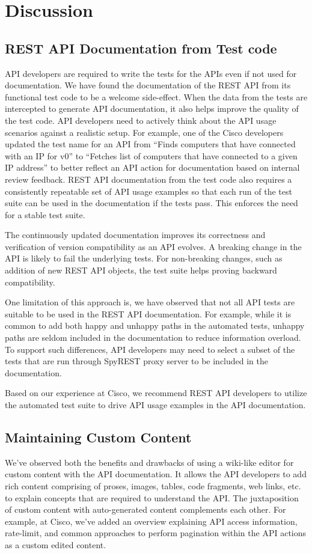 \documentclass[10pt, conference]{IEEEtran}
\begin{document}
\section{Discussion}

\subsection{REST API Documentation from Test code}
API developers are required to write the tests for the APIs even if not used for documentation. We have found the documentation of the REST API from its functional test code to be a welcome side-effect. When the data from the tests are intercepted to generate API documentation, it also helps improve the quality of the test code. API developers need to actively think about the API usage scenarios against a realistic setup. For example, one of the Cisco developers updated the test name for an API from ``Finds computers that have connected with an IP for v0'' to ``Fetches list of computers that have connected to a given IP address'' to better reflect an API action for documentation based on internal review feedback. REST API documentation from the test code also requires a consistently repeatable set of API usage examples so that each run of the test suite can be used in the documentation if the tests pass. This enforces the need for a stable test suite.

The continuously updated documentation improves its correctness and verification of version compatibility as an API evolves. A breaking change in the API is likely to fail the underlying tests. For non-breaking changes, such as addition of new REST API objects, the test suite helps proving backward compatibility.

One limitation of this approach is, we have observed that not all API tests are suitable to be used in the REST API documentation. For example, while it is common to add both happy and unhappy paths in the automated tests, unhappy paths are seldom included in the documentation to reduce information overload. To support such differences, API developers may need to select a subset of the tests that are run through SpyREST proxy server to be included in the documentation.

Based on our experience at Cisco, we recommend REST API developers to utilize the automated test suite to drive API usage examples in the API documentation.

\subsection{Maintaining Custom Content}
We've observed both the benefits and drawbacks of using a wiki-like editor for custom content with the API documentation. It allows the API developers to add rich content comprising of proses, images, tables, code fragments, web links, etc. to explain concepts that are required to understand the API. The juxtaposition of custom content with auto-generated content complements each other. For example, at Cisco, we've added an overview explaining API access information, rate-limit, and common approaches to perform pagination within the API actions as a custom edited content.
\end{document}
